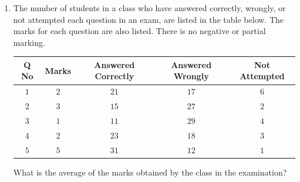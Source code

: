 \documentclass[journal,12pt,onecolumn]{IEEEtran}
\theoremstyle{remark}
\begin{document}
\begin{enumerate}[resume]
		\item The number of students in a class who have answered correctly, wrongly, or not attempted each question in an exam, are listed in the table below. The marks for each question are also listed. There is no negative or partial marking.
		
		\begin{table}[h]
			\label{tab:exam_results}
			\begin{center}
				\begin{tabular}{|c|c|c|c|c|}
					\hline
					Q No & Marks & Answered Correctly & Answered Wrongly & Not Attempted \\
					\hline
					$1$ & $2$ & $21$ & $17$ & $6$ \\
					\hline
					$2$ & $3$ & $15$ & $27$ & $2$ \\
					\hline
					$3$ & $1$ & $11$ & $29$ & $4$ \\
					\hline
					$4$ & $2$ & $23$ & $18$ & $3$ \\
					\hline
					$5$ & $5$ & $31$ & $12$ & $1$ \\
					\hline
				\end{tabular}
			\end{center}
		\end{table}
		
		What is the average of the marks obtained by the class in the examination?
		
		\hfill{}
		
		\begin{enumerate}
		\end{enumerate}
		
	\end{enumerate}
	\newpage
\end{document}
